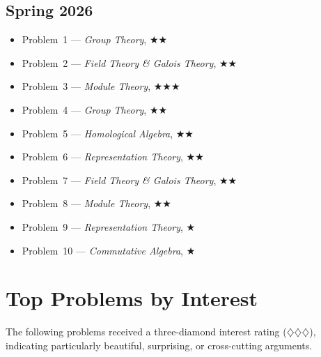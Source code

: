 \documentclass[11pt,letterpaper]{book}
\begin{document}
\section*{Spring 2026}
\begin{itemize}
\item Problem~1 --- \textit{Group Theory}, $\bigstar\bigstar$
\item Problem~2 --- \textit{Field Theory \& Galois Theory}, $\bigstar\bigstar$
\item Problem~3 --- \textit{Module Theory}, $\bigstar\bigstar\bigstar$
\item Problem~4 --- \textit{Group Theory}, $\bigstar\bigstar$
\item Problem~5 --- \textit{Homological Algebra}, $\bigstar\bigstar$
\item Problem~6 --- \textit{Representation Theory}, $\bigstar\bigstar$
\item Problem~7 --- \textit{Field Theory \& Galois Theory}, $\bigstar\bigstar$
\item Problem~8 --- \textit{Module Theory}, $\bigstar\bigstar$
\item Problem~9 --- \textit{Representation Theory}, $\bigstar$
\item Problem~10 --- \textit{Commutative Algebra}, $\bigstar$
\end{itemize}



\chapter{Top Problems by Interest}
\label{app:topproblems}
The following problems received a three-diamond interest rating ($\diamondsuit\diamondsuit\diamondsuit$), indicating particularly beautiful, surprising, or cross-cutting arguments.
\end{document}
